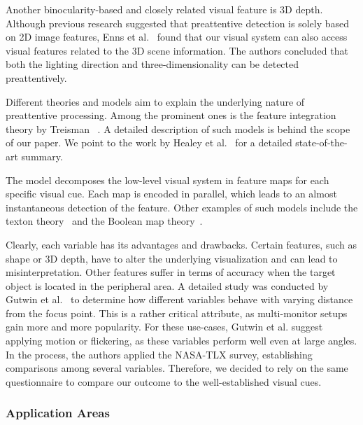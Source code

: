 \documentclass[journal]{vgtc}                %
\begin{document}
Another binocularity-based and closely related visual feature is 3D depth. Although previous research suggested that preattentive detection is solely based on 2D image features, Enns et al.~\cite{enns1990influence, enns1990sensitivity} found that our visual system can also access visual features related to the 3D scene information. The authors concluded that both the lighting direction and three-dimensionality can be detected preattentively. 




Different theories and models aim to explain the underlying nature of preattentive processing. Among the prominent ones is the feature integration theory by Treisman ~\cite{treisman1980feature}. A detailed description of such models is behind the scope of our paper. We point to the work by Healey et al.~\cite{Healey:2012:AVM:2225054.2225226} for a detailed state-of-the-art summary.



The model decomposes the low-level visual system in feature maps for each specific visual cue. Each map is encoded in parallel, which leads to an almost instantaneous detection of the feature. Other examples of such models include the texton theory~\cite{julesz1981textons} and the Boolean map theory~\cite{huang2007boolean}. 


Clearly, each variable has its advantages and drawbacks. Certain features, such as shape or 3D depth, have to alter the underlying visualization and can lead to misinterpretation. Other features suffer in terms of accuracy when the target object is located in the peripheral area. A detailed study was conducted by Gutwin et al.~\cite{Gutwin:2017:PPI:3025453.3025984} to determine how different variables behave with varying distance from the focus point. This is a rather critical attribute, as multi-monitor setups gain more and more popularity. For these use-cases, Gutwin et al. suggest applying motion or flickering, as these variables perform well even at large angles. In the process, the authors applied the NASA-TLX survey, establishing comparisons among several variables. Therefore, we decided to rely on the same questionnaire to compare our outcome to the well-established visual cues.



\subsubsection{Application Areas}
\end{document}

